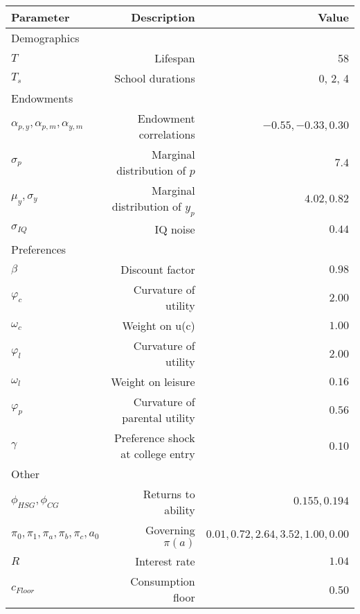 \begin{tabular}{lrr}
\hline
Parameter & Description  & Value  \\
\hline
Demographics &   &   \\
$T$ & Lifespan  & 58  \\
$T_{s}$ & School durations  & 0, 2, 4  \\
Endowments &   &   \\
$\alpha_{p,y}, \alpha_{p,m}, \alpha_{y,m}$ & Endowment correlations  & $-0.55, -0.33, 0.30$  \\
$\sigma_{p}$ & Marginal distribution of $p$  & $7.4$  \\
$\mu_{y}, \sigma_{y}$ & Marginal distribution of $y_{p}$  & $4.02, 0.82$  \\
$\sigma_{IQ}$ & IQ noise  & $0.44$  \\
Preferences &   &   \\
$\beta$ & Discount factor  & $0.98$  \\
$\varphi_{c}$ & Curvature of utility  & $2.00$  \\
$\omega_{c}$ & Weight on u(c)  & $1.00$  \\
$\varphi_{l}$ & Curvature of utility  & $2.00$  \\
$\omega_{l}$ & Weight on leisure  & $0.16$  \\
$\varphi_{p}$ & Curvature of parental utility  & $0.56$  \\
$\gamma$ & Preference shock at college entry  & $0.10$  \\
Other &   &   \\
$\phi_{HSG}, \phi_{CG}$ & Returns to ability  & $0.155, 0.194$  \\
$\pi_{0}, \pi_{1}, \pi_{a}, \pi_{b}, \pi_{c}, a_{0}$ & Governing $\pi(a)$  & $0.01, 0.72, 2.64, 3.52, 1.00, 0.00$  \\
$R$ & Interest rate  & $1.04$  \\
$c_{Floor}$ & Consumption floor  & 0.50  \\
\hline
\end{tabular}%
